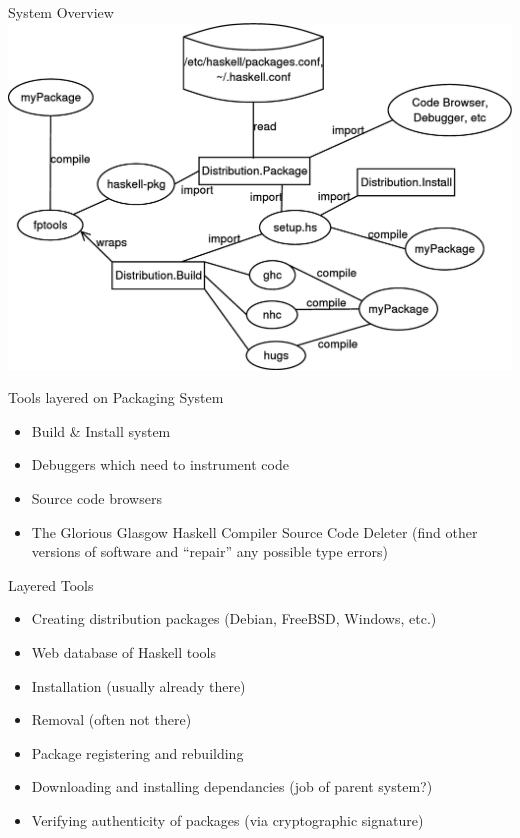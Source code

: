 \documentclass[pdf,rico,slideColor,colorBG]{prosper}
\begin{document}
\begin{slide}{System Overview}
   \includegraphics[width=.9\textwidth]{WholeSystem.eps}
\end{slide}






\begin{slide}{Tools layered on Packaging System}
\begin{itemize}
  \item Build \& Install system
  \item Debuggers which need to instrument code
  \item Source code browsers
  \item The Glorious Glasgow Haskell Compiler Source Code Deleter (find other versions of software and ``repair'' any possible type errors)
\end{itemize}
\end{slide}

\begin{slide}{Layered Tools} %
\begin{itemize}
  \item Creating distribution packages (Debian, FreeBSD, Windows, etc.)
  \item Web database of Haskell tools
  \item Installation (usually already there)
  \item Removal (often not there)
  \item Package registering and rebuilding
  \item Downloading and installing dependancies (job of parent system?)
  \item Verifying authenticity of packages (via cryptographic signature)
\end{itemize}
\end{slide}
\end{document}
